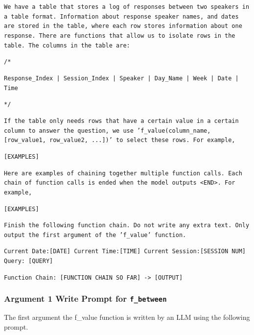 \documentclass{article}
\begin{document}
\colorbox{prompt_gray}{\begin{minipage}{.98\textwidth}
\texttt{We have a table that stores a log of responses between two speakers in a table format. Information about response speaker names, and dates are stored in the table, where each row stores information about one response. There are functions that allow us to isolate rows in the table. The columns in the table are:}
\newline

\texttt{/*}

\texttt{Response\_Index | Session\_Index | Speaker | Day\_Name | Week | Date | Time}

\texttt{*/}
\newline

\texttt{If the table only needs rows that have a certain value in a certain column to answer the question, we use 'f\_value(column\_name, [row\_value1, row\_value2, ...])' to select these rows. For example,}
\newline

\texttt{[EXAMPLES]}
\newline


\texttt{Here are examples of chaining together multiple function calls. Each chain of function calls is ended when the model outputs <END>. For example,}
\newline

\texttt{[EXAMPLES]}
\newline

\texttt{Finish the following function chain. Do not write any extra text. Only output the first argument of the 'f\_value' function.}
\newline

\texttt{Current Date:[DATE] Current Time:[TIME] Current Session:[SESSION NUM]}
\texttt{Query: [QUERY]}

\texttt{Function Chain: [FUNCTION CHAIN SO FAR] -> [OUTPUT]}
\end{minipage}}


\newpage
\subsubsection{Argument 1 Write Prompt for \texttt{f\_between}}
The first argument the f\_value function is written by an LLM using the following prompt.
\end{document}
